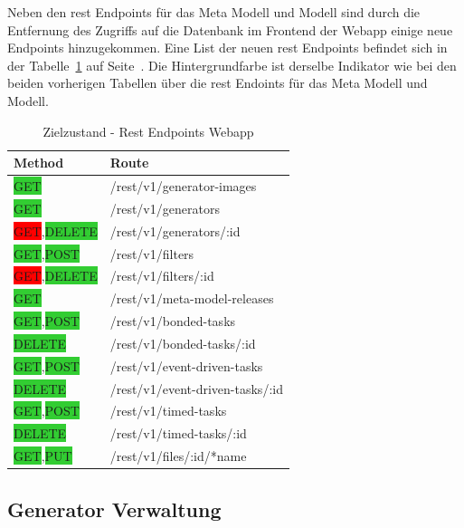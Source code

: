 Neben den \ac{rest} Endpoints für das Meta Modell und Modell sind durch die Entfernung des Zugriffs auf die Datenbank im Frontend der Webapp einige neue Endpoints hinzugekommen. Eine List der neuen \ac{rest} Endpoints befindet sich in der Tabelle~\ref{tab:ZETA_REST_APP_OLD} auf Seite~\pageref{tab:ZETA_REST_APP_OLD}. Die Hintergrundfarbe ist derselbe Indikator wie bei den beiden vorherigen Tabellen über die \ac{rest} Endoints für das Meta Modell und Modell. 

\begin{table}[ht]
    \smallskip
    \centering
    \begin{tabular}{| l | l |}
    \hline
    \bf Method & \bf Route \\ \hline
    \colorbox{LimeGreen}{GET} & /rest/v1/generator-images \\ \hline
    \colorbox{LimeGreen}{GET} & /rest/v1/generators \\ \hline
    \colorbox{red}{GET},\colorbox{LimeGreen}{DELETE} & /rest/v1/generators/:id \\ \hline
    \colorbox{LimeGreen}{GET},\colorbox{LimeGreen}{POST} & /rest/v1/filters \\ \hline
    \colorbox{red}{GET},\colorbox{LimeGreen}{DELETE} & /rest/v1/filters/:id \\ \hline
    \colorbox{LimeGreen}{GET} & /rest/v1/meta-model-releases \\ \hline
    \colorbox{LimeGreen}{GET},\colorbox{LimeGreen}{POST} & /rest/v1/bonded-tasks \\ \hline
    \colorbox{LimeGreen}{DELETE} & /rest/v1/bonded-tasks/:id  \\ \hline
    \colorbox{LimeGreen}{GET},\colorbox{LimeGreen}{POST} & /rest/v1/event-driven-tasks \\ \hline
    \colorbox{LimeGreen}{DELETE} & /rest/v1/event-driven-tasks/:id \\ \hline
    \colorbox{LimeGreen}{GET},\colorbox{LimeGreen}{POST} & /rest/v1/timed-tasks \\ \hline
    \colorbox{LimeGreen}{DELETE} & /rest/v1/timed-tasks/:id \\ \hline
    \colorbox{LimeGreen}{GET},\colorbox{LimeGreen}{PUT} & /rest/v1/files/:id/*name \\ \hline
    \end{tabular}
    \caption{Zielzustand - Rest Endpoints Webapp}
    \label{tab:ZETA_REST_APP_OLD}
\end{table}

\subsection{Generator Verwaltung}

